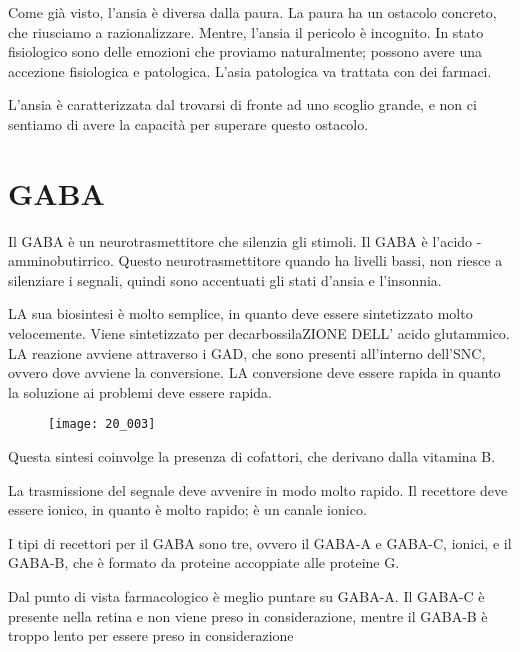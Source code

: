Come già visto, l'ansia è diversa dalla paura. La paura ha un ostacolo
concreto, che riusciamo a razionalizzare. Mentre, l'ansia il pericolo è
incognito. In stato fisiologico sono delle emozioni che proviamo
naturalmente; possono avere una accezione fisiologica e patologica.
L'asia patologica va trattata con dei farmaci.

L'ansia è caratterizzata dal trovarsi di fronte ad uno scoglio grande, e
non ci sentiamo di avere la capacità per superare questo ostacolo.

\section{GABA}


Il GABA è un neurotrasmettitore che silenzia gli stimoli. Il GABA è
l'acido \gamma-amminobutirrico. Questo neurotrasmettitore quando ha
livelli bassi, non riesce a silenziare i segnali, quindi sono accentuati
gli stati d'ansia e l'insonnia.

LA sua biosintesi è molto semplice, in quanto deve essere sintetizzato
molto velocemente. Viene sintetizzato per decarbossilaZIONE DELL' acido
glutammico. LA reazione avviene attraverso i GAD, che sono presenti
all'interno dell'SNC, ovvero dove avviene la conversione. LA conversione
deve essere rapida in quanto la soluzione ai problemi deve essere
rapida.

\begin{figure}[H]
    \centering
    \texttt{[image: 20\_003]}
\end{figure}

Questa sintesi coinvolge la presenza di cofattori, che derivano dalla
vitamina
B.

La trasmissione del segnale deve avvenire in modo molto rapido. Il
recettore deve essere ionico, in quanto è molto rapido; è un canale
ionico.

I tipi di recettori per il GABA sono tre, ovvero il GABA-A e GABA-C,
ionici, e il GABA-B, che è formato da proteine accoppiate alle proteine
G.


Dal punto di vista farmacologico è meglio puntare su GABA-A. Il GABA-C è
presente nella retina e non viene preso in considerazione, mentre il
GABA-B è troppo lento per essere preso in considerazione

